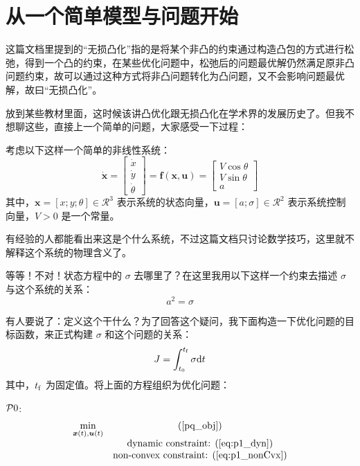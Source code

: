 \documentclass{article}
\numberwithin{equation}{section}
\begin{document}
\tableofcontents
\newpage

\section{从一个简单模型与问题开始}
这篇文档里提到的“无损凸化”指的是将某个非凸的约束通过构造凸包的方式进行松弛，得到一个凸的约束，在某些优化问题中，松弛后的问题最优解仍然满足原非凸问题约束，故可以通过这种方式将非凸问题转化为凸问题，又不会影响问题最优解，故曰“无损凸化”。

放到某些教材里面，这时候该讲凸优化跟无损凸化在学术界的发展历史了。但我不想聊这些，直接上一个简单的问题，大家感受一下过程：

考虑以下这样一个简单的非线性系统：
\begin{equation}
{\bm{\dot x}} = \left[ {\begin{array}{*{20}{c}}
{\dot x}\\
{\dot y}\\
{\dot \theta }
\end{array}} \right] = {\bm{f}}\left( {{\bm{x}},\bm{u}} \right) = \left[ {\begin{array}{*{20}{c}}
{V\cos \theta }\\
{V\sin \theta }\\
a
\end{array}} \right]
\label{eq:p1_dyn}
\end{equation}
其中，$\bm{x} = \left[x; y; \theta\right] \in \mathcal{R}^3$ 表示系统的状态向量，$\bm{u} = \left[a; \sigma\right] \in \mathcal{R}^2$ 表示系统控制向量，$V > 0$ 是一个常量。

有经验的人都能看出来这是个什么系统，不过这篇文档只讨论数学技巧，这里就不解释这个系统的物理含义了。

等等！不对！状态方程中的 $\sigma$ 去哪里了？在这里我用以下这样一个约束去描述 $\sigma$ 与这个系统的关系：
\begin{equation}
{a^2} = \sigma
\label{eq:p1_nonCvx}
\end{equation}

有人要说了：定义这个干什么？为了回答这个疑问，我下面构造一下优化问题的目标函数，来正式构建 $\sigma$ 和这个问题的关系：
\begin{equation}
J = \int_{{t_0}}^{{t_{\rm{f}}}} {\sigma {\rm{d}}t}
\label{pq_obj}
\end{equation}
其中，$t_{\rm{f}}$ 为固定值。将上面的方程组织为优化问题：

$\mathcal{P}\thesection$:
\[\begin{array}{*{20}{c}}
{\mathop {\min }\limits_{{\bm{x}}\left( t \right),{\bm{u}}\left( t \right)} }&(\ref{pq_obj})\\
{}&{{\text{dynamic constraint: }}(\ref{eq:p1_dyn})}\\
{}&{{\text{non-convex constraint: }}(\ref{eq:p1_nonCvx})}
\end{array}\]
\end{document}
